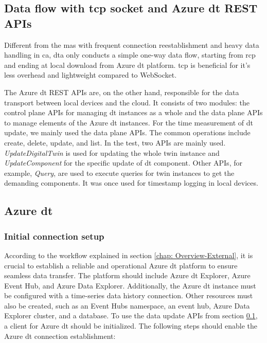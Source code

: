 \subsection{Data flow with \gls{tcp} socket and Azure \gls{dt} REST APIs}\label{chap: RCPTCP-DTAPI}
Different from the \gls{mas} with frequent connection reestablishment and heavy data handling in \gls{ca}, 
\gls{dta} only conducts a simple one-way data flow, starting from \gls{rcp} and 
ending at local download from Azure \gls{dt} platform. \gls{tcp} is beneficial for 
it's less overhead and lightweight compared to WebSocket. 


The Azure \gls{dt} REST APIs are, on the other hand, responsible for the data 
transport between local devices and the cloud. It consists of two modules: the 
control plane APIs for managing \gls{dt} instances as a whole and the 
data plane APIs to manage elements of the Azure \gls{dt} instances. For the 
time measurement of \gls{dt} update, we mainly used the data plane APIs. The 
common operations include create, delete, update, and list. In the test, two 
APIs are mainly used. \textit{UpdateDigitalTwin} is used for updating 
the whole twin instance 
and \textit{UpdateComponent} for the specific update of \gls{dt} component. 
Other APIs, for example, \textit{Query}, are used to execute queries for twin 
instances to get the demanding components. It was once used for timestamp 
logging in local devices. 


\subsection{Azure \gls{dt}}
\subsubsection{Initial connection setup}
According to the workflow explained in section \ref{chap: Overview-External}, 
it is crucial to establish a reliable and operational Azure \gls{dt} platform 
to ensure seamless data transfer. The platform should include Azure \gls{dt} Explorer, 
Azure Event Hub, and Azure Data Explorer. Additionally, the Azure \gls{dt} 
instance must be configured with a time-series data history connection. Other resources 
must also be created, such as an Event Hubs namespace, an event hub, Azure Data Explorer 
cluster, and a database. To use the data update APIs 
from section \ref{chap: RCPTCP-DTAPI}, a client for Azure \gls{dt} should be 
initialized. The following steps should enable the Azure \gls{dt} connection 
establishment: 


